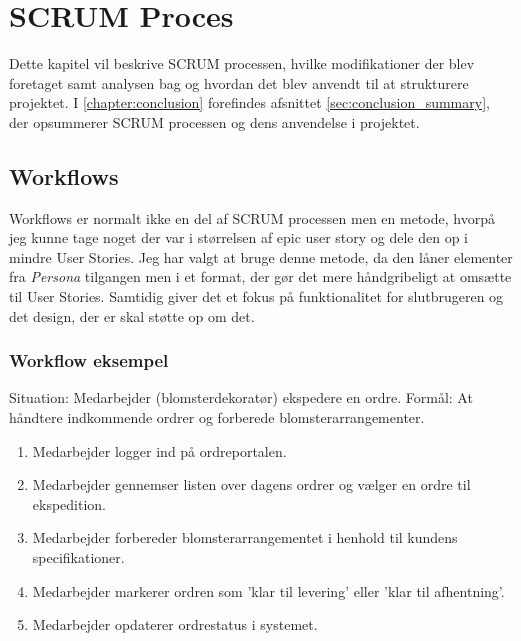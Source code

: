 \chapter{SCRUM Proces}
\label{chapter:scrum}

Dette kapitel vil beskrive SCRUM processen, hvilke modifikationer der blev foretaget samt analysen bag og hvordan det blev anvendt til at strukturere projektet. 
I \ref{chapter:conclusion} forefindes afsnittet \ref{sec:conclusion_summary}, der opsummerer SCRUM processen og dens anvendelse i projektet.

\section{Workflows}
Workflows er normalt ikke en del af SCRUM processen men en metode, hvorpå jeg kunne tage noget der var i størrelsen af epic user story og dele den op i mindre User Stories. 
Jeg har valgt at bruge denne metode, da den låner elementer fra \emph{Persona} tilgangen men i et format, der gør det mere håndgribeligt at omsætte til User Stories.
Samtidig giver det et fokus på funktionalitet for slutbrugeren og det design, der er skal støtte op om det.

\subsection{Workflow eksempel}
Situation: Medarbejder (blomsterdekoratør) ekspedere en ordre.
Formål: At håndtere indkommende ordrer og forberede blomsterarrangementer.
\begin{enumerate}
    \item Medarbejder logger ind på ordreportalen.
    \item Medarbejder gennemser listen over dagens ordrer og vælger en ordre til ekspedition.
    \item Medarbejder forbereder blomsterarrangementet i henhold til kundens specifikationer.
    \item Medarbejder markerer ordren som 'klar til levering' eller 'klar til afhentning'.
    \item Medarbejder opdaterer ordrestatus i systemet.
    \label{item:workflow-eksempel}
\end{enumerate}


